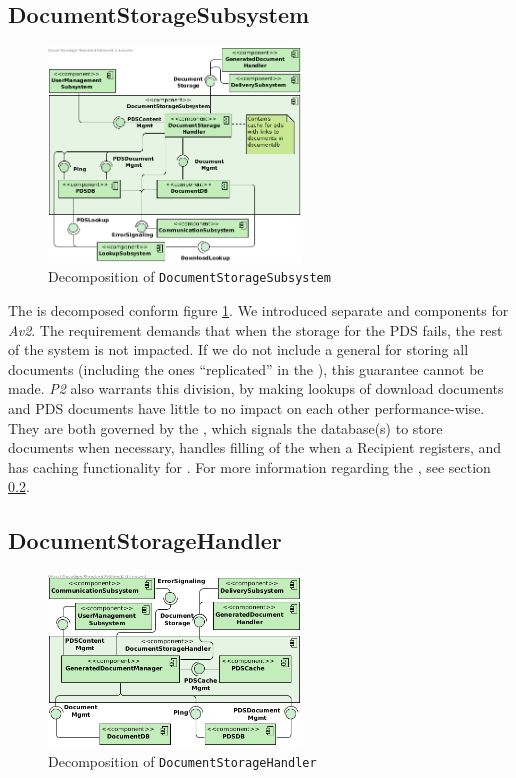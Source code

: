 \subsection{DocumentStorageSubsystem}\label{sec:decomp-docstosub}
\begin{figure}[!htp]
    \centering
    \includegraphics[width=0.6\textwidth]{figures/Document Storage Subsystem.png}
    \caption{Decomposition of \texttt{DocumentStorageSubsystem}}\label{fig:decomp-docstosub}
\end{figure}

The  is decomposed conform figure \ref{fig:decomp-docstosub}. We introduced separate  and  components for \emph{Av2}. The requirement demands that when the storage for the PDS fails, the rest of the system is not impacted. If we do not include a general  for storing all documents (including the ones ``replicated'' in the ), this guarantee cannot be made. \emph{P2} also warrants this division, by making lookups of download documents and PDS documents have little to no impact on each other performance-wise. They are both governed by the , which signals the database(s) to store documents when necessary, handles filling of the  when a Recipient registers, and has caching functionality for . For more information regarding the , see section \ref{sec:decomp-docstohan}.

\subsection{DocumentStorageHandler}\label{sec:decomp-docstohan}
\begin{figure}[!htp]
    \centering
    \includegraphics[width=0.6\textwidth]{figures/DocumentStorageHandler.png}
    \caption{Decomposition of \texttt{DocumentStorageHandler}}\label{fig:decomp-docstohan}
\end{figure}

